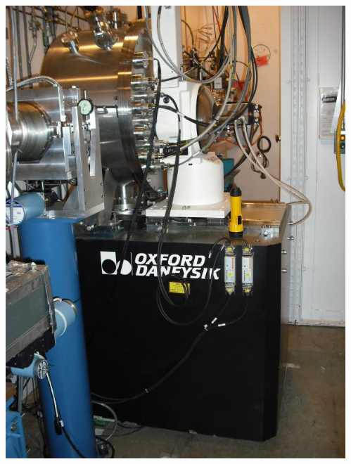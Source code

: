 \documentclass[10pt, xcolor=x11names, compress]{beamer}
\begin{document}
\begin{frame}
\begin{columns}
\begin{column}{0.5\linewidth}
\begin{center}
      \end{center}
    \end{column}
    \begin{column}{0.5\linewidth}
      \begin{center}
        \includegraphics[width=0.8\linewidth]{bl/mono_exterior.jpeg}
      \end{center}
    \end{column}
  \end{columns}
\end{frame}
\end{document}
